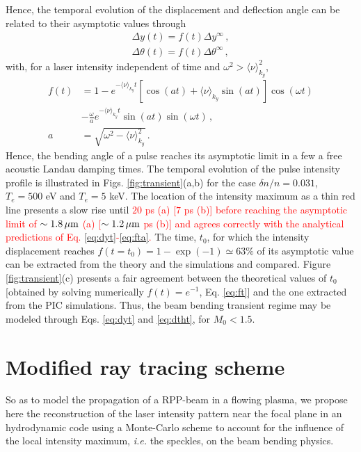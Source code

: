 \documentclass[%
 reprint,
 amsmath,amssymb,
 aps,
]{revtex4-1}
\begin{document}
Hence, the temporal evolution of the displacement and deflection angle can be related to their asymptotic values through
\begin{align}
    \Delta y (t) = f(t)\Delta y^\infty \, , \label{eq:dyt} \\
    \Delta \theta (t) = f(t)\Delta \theta^\infty \, , \label{eq:dtht}
\end{align}
with, for a laser intensity independent of time and $\omega^2 > \langle \nu \rangle_{k_y} ^2$,
\begin{align}
 f(t)  &= 1 -e^{- \langle \nu \rangle_{k_y}  t}[\cos(at)+ \langle \nu \rangle_{k_y}  \sin(at)] \cos(\omega t)\nonumber \\
 &-\frac{\omega}{a} e^{- \langle \nu \rangle_{k_y}  t}  \sin(at) \sin(\omega t)\, ,\label{eq:ft}\\
 a &= \sqrt{\omega^2 - \langle \nu \rangle_{k_y}^2} \label{eq:fta}\, .
\end{align}
Hence, the bending angle of a pulse reaches its asymptotic limit in a  few a free acoustic Landau damping times.
The temporal evolution of the pulse intensity profile is illustrated in Figs. \ref{fig:transient}(a,b) for the case $\delta n/n=0.031$, $T_e=500$ eV and $T_e=5$ keV. 
The location of  the intensity maximum  as a thin red line presents a slow rise  until \textcolor{red}{$20$ ps  (a) [$7$ ps  (b)]
before reaching the asymptotic limit of $ \sim1.8 \,\rm \mu m$ (a) [$ \sim1.2 \,\rm \mu m$  ps  (b)] and agrees correctly with the analytical predictions of Eq. \eqref{eq:dyt}-\eqref{eq:fta}. 
}
The time, $t_0$, for which the intensity  displacement reaches $f(t=t_0)=1-\exp(-1)\simeq 63\%$ of its asymptotic value can be extracted from the theory and the simulations and compared. Figure \ref{fig:transient}(c) presents a fair agreement between the theoretical values  of  $t_0$ [obtained by solving numerically $f(t)=e^{-1}$, Eq. \eqref{eq:ft}] and the one extracted from the PIC simulations. Thus, the beam bending transient regime may be modeled through Eqs. \eqref{eq:dyt} and \eqref{eq:dtht}, for $M_0<1.5$. 

\section{Modified ray tracing scheme}
So as to model the propagation of a RPP-beam in a flowing plasma, we propose here the reconstruction of the laser intensity pattern near the focal plane in an hydrodynamic code using a Monte-Carlo scheme to account for the influence of the local intensity maximum, \emph{i.e.} the speckles, on the beam bending physics.
\end{document}

